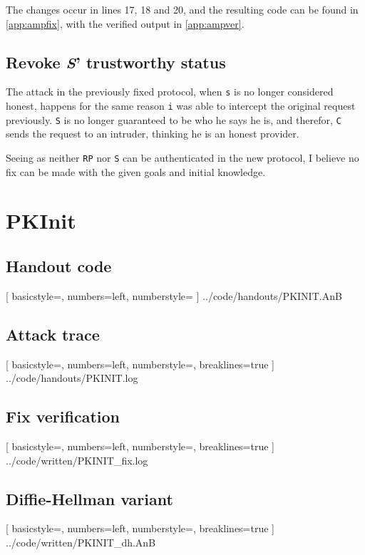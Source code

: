 \documentclass{article}
\begin{document}
The changes occur in lines 17, 18 and 20, 
and the resulting code can be found in \ref{app:ampfix}, 
with the verified output in \ref{app:ampver}.

\subsection{Revoke \emph{S}' trustworthy status}
The attack in the previously fixed protocol, when \texttt{s} is no longer
considered honest, happens for the same reason \texttt{i} was able
to intercept the original request previously.
\texttt{S} is no longer guaranteed to be who he says he is,
and therefor, \texttt{C} sends the request to an intruder, thinking
he is an honest provider.

Seeing as neither \texttt{RP} nor \texttt{S} can be authenticated in the new protocol,
I believe no fix can be made with the given goals and initial knowledge.

\newpage
\appendix

\section{PKInit}

\subsection{Handout code}

	[
		basicstyle=\footnotesize,
		numbers=left, 
		numberstyle=\tiny
	]
	{../code/handouts/PKINIT.AnB}

\subsection{Attack trace}
\label{app:pktrace}

	[
		basicstyle=\footnotesize,
		numbers=left,
		numberstyle=\tiny,
		breaklines=true
	]
	{../code/handouts/PKINIT.log}
	
\subsection{Fix verification}
\label{app:pkfix-log}

	[
		basicstyle=\footnotesize,
		numbers=left,
		numberstyle=\tiny,
		breaklines=true
	]
	{../code/written/PKINIT_fix.log}

\subsection{Diffie-Hellman variant}
\label{app:pkdh}

	[
		basicstyle=\footnotesize,
		numbers=left,
		numberstyle=\tiny,
		breaklines=true
	]
	{../code/written/PKINIT_dh.AnB}
\end{document}
